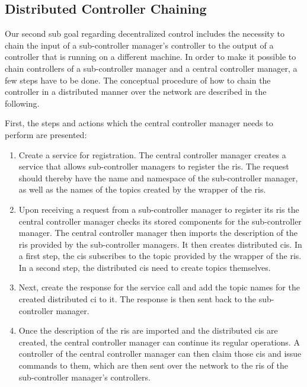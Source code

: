 \subsection{Distributed Controller Chaining}
Our second sub goal regarding decentralized control includes the necessity to chain the input of a sub-controller manager's controller to the output of a controller that is running on a different machine. In order to make it possible to chain controllers of a sub-controller manager and a central controller manager, a few steps have to be done. The conceptual procedure of how to chain the controller in a distributed manner over the network are described in the following.

First, the steps and actions which the central controller manager needs to perform are presented:
\begin{enumerate}
    \item Create a service for registration. The central controller manager creates a service that allows sub-controller managers to register the \glspl{ri}. The request should thereby have the name and namespace of the sub-controller manager, as well as the names of the topics created by the wrapper of the \glspl{ri}.
        
    \item Upon receiving a request from a sub-controller manager to register its \glspl{ri} the central controller manager checks its stored components for the sub-controller manager. The central controller manager then imports the description of the \glspl{ri} provided by the sub-controller managers. It then creates distributed \glspl{ci}. In a first step, the \glspl{ci} subscribes to the topic provided by the wrapper of the \glspl{ri}. In a second step, the distributed \glspl{ci} need to create topics themselves.
    
    \item Next, create the response for the service call and add the topic names for the created distributed \gls{ci} to it. The response is then sent back to the sub-controller manager.
    
    \item  Once the description of the \glspl{ri} are imported and the distributed \glspl{ci} are created, the central controller manager can continue its regular operations. A controller of the central controller manager can then claim those \glspl{ci} and issue commands to them, which are then sent over the network to the \glspl{ri} of the sub-controller manager's controllers.
\end{enumerate}

